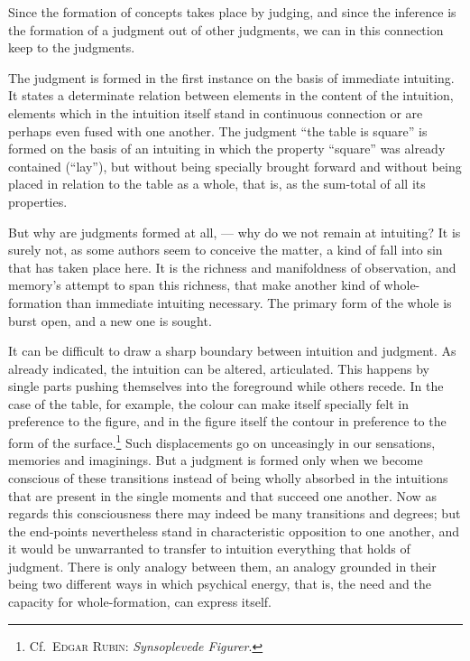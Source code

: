 \documentclass[12pt]{book}
\begin{document}
Since the formation of concepts takes place by judging, and since the inference
is the formation of a judgment out of other judgments, we can in this connection
keep to the judgments.

The judgment is formed in the first instance on the basis of immediate
intuiting. It states a determinate relation between elements in the content of
the intuition, elements which in the intuition itself stand in continuous
connection or are perhaps even fused with one another. The judgment ``the table
is square'' is formed on the basis of an intuiting in which the property
``square'' was already contained (``lay''), but without being specially brought
forward and without being placed in relation to the table as a whole, that is,
as the sum-total of all its properties.

But why are judgments formed at all, --- why do we not remain at intuiting? It
is surely not, as some authors seem to conceive the matter, a kind of fall into
sin that has taken place here. It is the richness and manifoldness of
observation, and memory's attempt to span this richness, that make another kind
of whole-formation than immediate intuiting necessary. The primary form of the
whole is burst open, and a new one is sought.

It can be difficult to draw a sharp boundary between intuition and judgment. As
already indicated, the intuition can be altered, articulated. This happens by
single parts pushing themselves into the foreground while others recede. In the
case of the table, for example, the colour can make itself specially felt in
preference to the figure, and in the figure itself the contour in preference to
the form of the surface.\footnote{Cf.\ \textsc{Edgar Rubin}: \textit{Synsoplevede
Figurer}.} Such displacements go on unceasingly in our sensations, memories and
imaginings. But a judgment is formed only when we become conscious of these
transitions instead of being wholly absorbed in the intuitions that are present
in the single moments and that succeed one another. Now as regards this
consciousness there may indeed be many transitions and degrees; but the
end-points nevertheless stand in characteristic opposition to one another, and
it would be unwarranted to transfer to intuition everything that holds of
judgment. There is only analogy between them, an analogy grounded in their being
two different ways in which psychical energy, that is, the need and the capacity
for whole-formation, can express itself.
\end{document}
